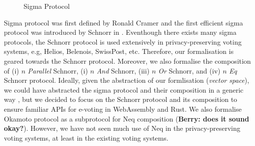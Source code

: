 \documentclass[conference,compsoc]{IEEEtran}
\begin{document}
\begin{figure}[ht]
  \centering
{}
\caption{Sigma Protocol}
\label{fig:sig_picture}
\end{figure}







Sigma protocol was first defined by Ronald Cramer \cite{cramer1996modular} 
and the first efficient sigma protocol was introduced by Schnorr in \cite{schnorr1991efficient}. 
Eventhough there exists many sigma protocols, the Schnorr protocol is used extensively in privacy-preserving voting systems, e.g, Helios, Belenois, SwissPost, etc. Therefore, 
our formalisation is geared towards the Schnorr protocol. 
Moreover, we also formalise the composition of (i) $n$ \textit{Parallel} Schnorr, 
(i) $n$ \textit{And} Schnorr, (iii) $n$ \textit{Or} Schnorr, and (iv) $n$ \textit{Eq} Schnorr protocol. 
Ideally, given the abstraction of our formlisation (\textit{vector space}), we could have 
abstracted the sigma protocol and their composition in a generic way \cite{10.1007/978-3-642-02384-2_17},
but we decided to focus on the Schnorr protocol and its composition to ensure familiar APIs 
for e-voting in WebAssembly and Rust. We also formalise Okamoto protocol as a subprotocol 
for Neq composition (\textbf{Berry: does it sound okay?}). However, we have not seen 
much use of Neq in the privacy-preserving voting systems, at least in the existing voting systems. 
\end{document}
